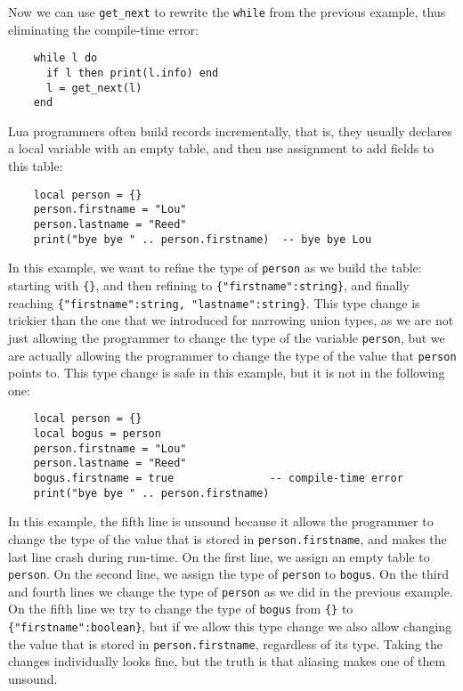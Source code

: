 Now we can use \texttt{get\string_next} to rewrite the \texttt{while}
from the previous example, thus eliminating the compile-time error:
\begin{verbatim}
    while l do
      if l then print(l.info) end
      l = get_next(l)
    end
\end{verbatim}

Lua programmers often build records incrementally, that is,
they usually declares a local variable with an empty table,
and then use assignment to add fields to this table:
\begin{verbatim}
    local person = {}
    person.firstname = "Lou"
    person.lastname = "Reed"
    print("bye bye " .. person.firstname)  -- bye bye Lou
\end{verbatim}

In this example, we want to refine the type of \texttt{person} as
we build the table:
starting with \texttt{\{\}}, and then refining to \texttt{\{"firstname":string\}},
and finally reaching \texttt{\{"firstname":string, "lastname":string\}}.
This type change is trickier than the one that we introduced for narrowing
union types, as we are not just allowing the programmer to change
the type of the variable \texttt{person}, but we are actually allowing
the programmer to change the type of the value that \texttt{person} points to.
This type change is safe in this example, but it is not in the following one:
\begin{verbatim}
    local person = {}
    local bogus = person
    person.firstname = "Lou"
    person.lastname = "Reed"
    bogus.firstname = true               -- compile-time error
    print("bye bye " .. person.firstname)
\end{verbatim}

In this example, the fifth line is unsound because it allows the
programmer to change the type of the value that is stored in
\texttt{person.firstname}, and makes the last line crash during
run-time.
On the first line, we assign an empty table to \texttt{person}.
On the second line, we assign the type of \texttt{person} to
\texttt{bogus}.
On the third and fourth lines we change the type of \texttt{person}
as we did in the previous example.
On the fifth line we try to change the type of \texttt{bogus}
from \texttt{\{\}} to \texttt{\{"firstname":boolean\}},
but if we allow this type change we also allow changing the value
that is stored in \texttt{person.firstname}, regardless of its type.
Taking the changes individually looks fine, but the truth is that
aliasing makes one of them unsound.

